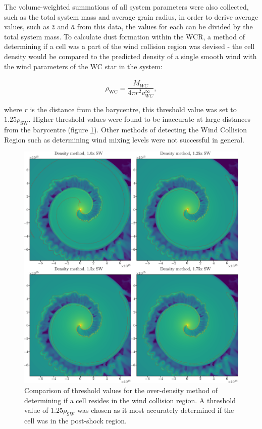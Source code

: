 The volume-weighted summations of all system parameters were also collected, such as the total system mass and average grain radius, in order to derive average values, such as $\bar{z}$ and $\bar{a}$ from this data, the values for each can be divided by the total system mass.
To calculate dust formation within the WCR, a method of determining if a cell was a part of the wind collision region was devised - the cell density would be compared to the predicted density of a single smooth wind with the wind parameters of the WC star in the system:

\begin{equation}
  \rho_\text{WC} = \frac{\dot{M}_{WC}}{4 \pi r^2 v^\infty_{WC}},
\end{equation}

\noindent
where $r$ is the distance from the barycentre, this threshold value was set to $1.25\rho_\text{SW}$.
Higher threshold values were found to be inaccurate at large distances from the barycentre (figure \ref{fig:overdensity-threshold}).
Other methods of detecting the Wind Collision Region such as determining wind mixing levels were not successful in general.

\begin{figure}[p]
  \centering
  \includegraphics[width=5in]{assets/overdensity-method.png}
  \caption[Comparison of threshold values for over-density method]{Comparison of threshold values for the over-density method of determining if a cell resides in the wind collision region.
  A threshold value of $1.25\rho_\text{SW}$ was chosen as it most accurately determined if the cell was in the post-shock region.}
  \label{fig:overdensity-threshold}
\end{figure}

